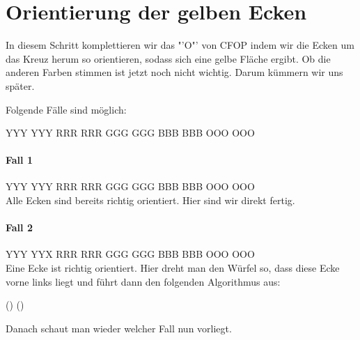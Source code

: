 \section{Orientierung der gelben Ecken}
\parbox{0.7\linewidth}{
In diesem Schritt komplettieren wir das "'O"' von CFOP indem wir die Ecken um das Kreuz herum so orientieren, sodass sich eine gelbe Fläche ergibt.
Ob die anderen Farben stimmen ist jetzt noch nicht wichtig.
Darum kümmern wir uns später.

Folgende Fälle sind möglich:
}
\RubikCubeGreyAll%
            {Y}{Y}{Y}
            {Y}{Y}{Y}%
               {R}{R}{R}
	       {R}{R}{R}%
	       {G}{G}{G}
	       {G}{G}{G}%
	      {B}{B}{B}
	      {B}{B}{B}%
	      {O}{O}{O}
	      {O}{O}{O}%
\\[1em]

\paragraph{Fall 1}
\RubikCubeGreyAll%
            {Y}{Y}{Y}
            {Y}{Y}{Y}%
               {R}{R}{R}
	       {R}{R}{R}%
	       {G}{G}{G}
	       {G}{G}{G}%
	      {B}{B}{B}
	      {B}{B}{B}%
	      {O}{O}{O}
	      {O}{O}{O}%
\\[1em]
Alle Ecken sind bereits richtig orientiert. Hier sind wir direkt fertig.

\paragraph{Fall 2}
\RubikCubeGreyAll%
            {Y}{Y}{Y}
            {Y}{Y}{X}%
               {R}{R}{R}
	       {R}{R}{R}%
	       {G}{G}{G}
	       {G}{G}{G}%
	      {B}{B}{B}
	      {B}{B}{B}%
	      {O}{O}{O}
	      {O}{O}{O}%
\\[1em]
Eine Ecke ist richtig orientiert. Hier dreht man den Würfel so, dass diese Ecke vorne links liegt und führt dann den folgenden Algorithmus aus:
\begin{center}
	\sffamily\Large () ()
\end{center}
Danach schaut man wieder welcher Fall nun vorliegt.


